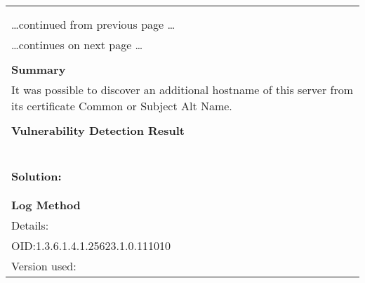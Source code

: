 \documentclass{article}
\begin{document}
\begin{longtable}{|p{}|}
\hline
\rowcolor{gvm_log}{\color{white}{Log (CVSS: 0.0) }}\\
\rowcolor{gvm_log}{\color{white}{NVT: SSL/TLS: Hostname discovery from server certificate}}\\
\hline
\endfirsthead
\hfill\ldots continued from previous page \ldots \\
\hline
\endhead
\hline
\ldots continues on next page \ldots \\
\endfoot
\hline
\endlastfoot
\\
\textbf{Summary}\\
It was possible to discover an additional hostname
  of this server from its certificate Common or Subject Alt Name.\\

        \hline
        \\
\textbf{Vulnerability Detection Result}\\
\rowcolor{white}{\verb=The following additional and resolvable hostnames pointing to a different host i=}\\
\rowcolor{white}{$\hookrightarrow$\verb=p were detected:=}\\
\rowcolor{white}{\verb=homeprinter=}\\
\rowcolor{white}{\verb=The following additional but not resolvable hostnames were detected:=}\\
\rowcolor{white}{\verb=homeprinter.local=}\\

          \hline
          \\
\textbf{Solution:}\\
\\


        \hline
        \\
\textbf{Log Method}\\
Details:
\rowcolor{white}{\verb=SSL/TLS: Hostname discovery from server certificate=}\\
OID:1.3.6.1.4.1.25623.1.0.111010\\
Version used:
\rowcolor{white}{\verb=2021-11-22T15:32:39Z=}\\
\end{longtable}
\end{document}
